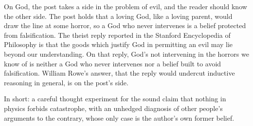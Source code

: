 \begin{afterword}
On God, the post takes a side in the problem of evil, and the reader should know the other side. The post holds that a loving God, like a loving parent, would draw the line at some horror, so a God who never intervenes is a belief protected from falsification. The theist reply reported in the Stanford Encyclopedia of Philosophy is that the goods which justify God in permitting an evil may lie beyond our understanding. On that reply, God's not intervening in the horrors we know of is neither a God who never intervenes nor a belief built to avoid falsification. William Rowe's answer, that the reply would undercut inductive reasoning in general, is on the post's side.

In short: a careful thought experiment for the sound claim that nothing in physics forbids catastrophe, with an unhedged diagnosis of other people's arguments to the contrary, whose only case is the author's own former belief.
\end{afterword}
